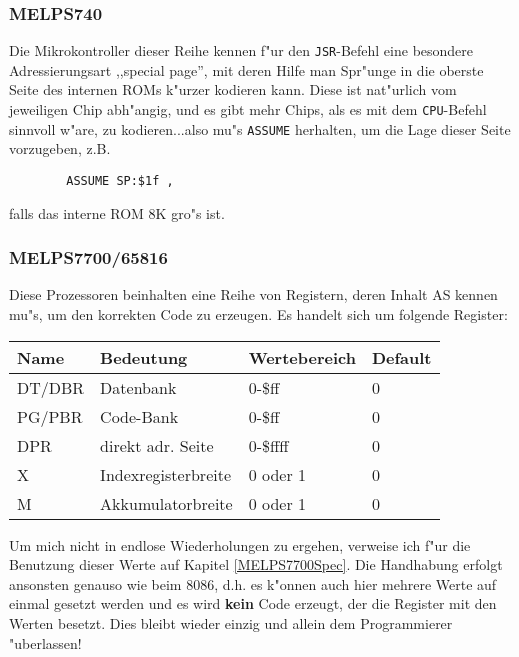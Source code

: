 \documentclass[12pt,a4paper,twoside]{report}
\newcommand{\bb}[1]{{\bf #1}}
\newcommand{\tty}[1]{{\tt #1}}
\begin{document}

\subsubsection{MELPS740}

Die Mikrokontroller dieser Reihe kennen f"ur den \tty{JSR}-Befehl eine
besondere Adressierungsart ,,special page'', mit deren Hilfe man Spr"unge
in die oberste Seite des internen ROMs k"urzer kodieren kann.  Diese
ist nat"urlich vom jeweiligen Chip abh"angig, und es gibt mehr Chips,
als es mit dem \tty{CPU}-Befehl sinnvoll w"are, zu kodieren...also mu"s
\tty{ASSUME} herhalten, um die Lage dieser Seite vorzugeben, z.B.
\begin{verbatim}
        ASSUME SP:$1f ,
\end{verbatim}
falls das interne ROM 8K gro"s ist.


\subsubsection{MELPS7700/65816}

Diese Prozessoren beinhalten eine Reihe von Registern, deren Inhalt AS
kennen mu"s, um den korrekten Code zu erzeugen.  Es handelt sich um folgende
Register:
\begin{center}\begin{tabular}{|l|l|l|l|}
\hline
Name  & Bedeutung           & Wertebereich & Default\\
\hline
\hline
DT/DBR & Datenbank           & 0-\$ff       & 0 \\
PG/PBR & Code-Bank           & 0-\$ff       & 0 \\
DPR   & direkt adr. Seite   & 0-\$ffff     & 0 \\
X     & Indexregisterbreite & 0 oder 1     & 0 \\
M     & Akkumulatorbreite   & 0 oder 1     & 0 \\
\hline
\end{tabular}\end{center}
\par
Um mich nicht in endlose Wiederholungen zu ergehen, verweise ich f"ur die
Benutzung dieser Werte auf Kapitel \ref{MELPS7700Spec}.  Die Handhabung
erfolgt ansonsten genauso wie beim 8086, d.h. es k"onnen auch hier mehrere
Werte auf einmal gesetzt werden und es wird \bb{kein} Code erzeugt, der
die Register mit den Werten besetzt.  Dies bleibt wieder einzig und allein
dem Programmierer "uberlassen!
\end{document}
